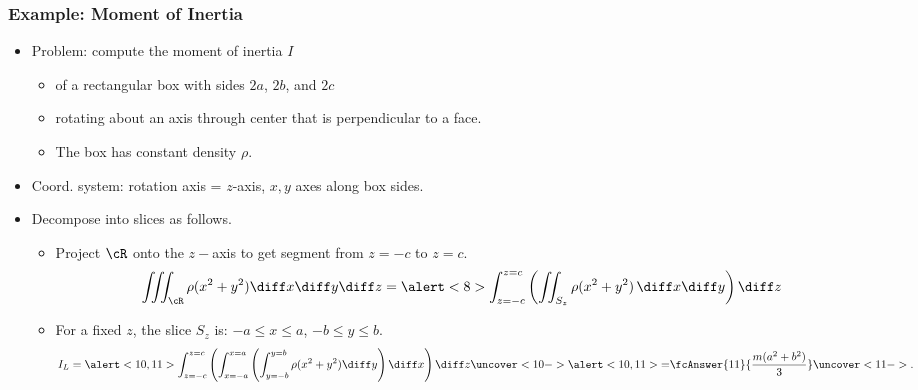\begin{frame}
\frametitle{Example: Moment of Inertia}
\begin{itemize}
\item Problem: compute the moment of inertia $I$
\begin{itemize}
\item \alert<2>{of a rectangular box with sides $2a$, $2b$, and $2c$}
\item \alert<3>{rotating about an axis through center that is perpendicular to a face.}
\item \alert<4>{The box has constant density $\rho$.} 
\end{itemize}
\item<5-> Coord. system: rotation axis = $z$-axis, $x,y$ axes along box sides.
\item<7-> Decompose into slices as follows.
\begin{itemize}
\item<7-> Project $\cR$ onto the $z-$axis \alert<8>{to get segment from $z=-c$ to $z=c$.}
\[
\iiint_{\cR} \rho (x^2+y^2) \diff x \diff y \diff z = \alert<8>{\int_{z=-c}^{z=c}} \left( \iint_{S_z} \rho (x^2+y^2)\, \diff x \diff y \right) \diff z
\]    
\item<9-> For a fixed $z$, the slice $S_z$ is: $-a \leq x \leq a$, $-b \leq  y \leq  b$.
\[
I_L = \alert<10,11>{ \int_{z=-c}^{z=c} \left(\int_{x=-a}^{x=a} \left( \int_{y=-b}^{y=b} \rho (x^2+y^2)  \diff y \right)  \diff x\right)  \diff z} \uncover<10->{\alert<10,11>{=}} \fcAnswer{11}{\frac{m(a^2+b^2)}{3}} \uncover<11->{.}
\]
%

\end{itemize}
  \end{itemize}
\end{frame}